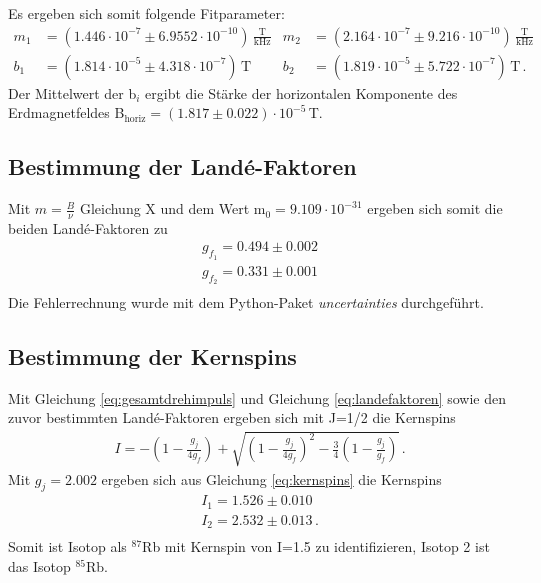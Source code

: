 \documentclass[]{scrartcl}
\begin{document}
Es ergeben sich somit folgende Fitparameter:
\begin{align*}
m_1&=(1.446\cdot 10^{-7} \pm 6.9552\cdot 10^{-10})\,\frac{\text{T}}{\text{kHz}} & m_2&=(2.164\cdot 10^{-7} \pm 9.216\cdot 10^{-10})\,\frac{\text{T}}{\text{kHz}} \\
b_1&=(1.814\cdot 10^{-5} \pm 4.318\cdot 10^{-7})\,\text{T} & b_2&=(1.819\cdot 10^{-5} \pm 5.722\cdot 10^{-7})\,\text{T}\,.
\end{align*}
Der Mittelwert der b$_i$ ergibt die Stärke der horizontalen Komponente des Erdmagnetfeldes B$_{\text{horiz}}=(1.817\pm0.022)\cdot10^{-5}$\,T. \\

\subsection{Bestimmung der Landé-Faktoren}
Mit $m=\frac{B}{\nu}$ Gleichung X und dem Wert m$_0=9.109\cdot10^{-31}$ ergeben sich somit die beiden Landé-Faktoren zu
\begin{align*}
g_{f_{1}}= 0.494 \pm 0.002\\
g_{f_{2}}= 0.331 \pm 0.001 \\
\end{align*}
Die Fehlerrechnung wurde mit dem Python-Paket \textit{uncertainties} durchgeführt.

\subsection{Bestimmung der Kernspins}
Mit Gleichung \ref{eq:gesamtdrehimpuls} und Gleichung \ref{eq:landefaktoren} sowie den zuvor bestimmten Landé-Faktoren ergeben sich mit J=1/2 die Kernspins
\begin{align}
I=-\left( 1-\frac{g_j}{4g_f}\right) +\sqrt{\left( 1-\frac{g_j}{4g_f}\right)^2-\frac{3}{4}\left( 1-\frac{g_j}{g_f}\right)}\,.
\label{eq:kernspins}
\end{align}
Mit $g_j=2.002$ ergeben sich aus Gleichung \ref{eq:kernspins} die Kernspins
\begin{align*}
I_1= 1.526 \pm 0.010\\
I_2= 2.532 \pm 0.013\,.\\
\end{align*}
Somit ist Isotop  als $^{87}$Rb mit Kernspin von I=1.5 zu identifizieren, Isotop 2 ist das Isotop $^{85}$Rb.
\end{document}
